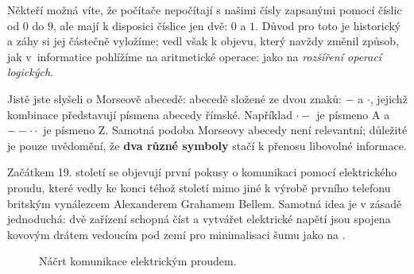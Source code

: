 Někteří možná víte, že počítače nepočítají s našimi  čísly zapsanými
pomocí číslic od $0$ do $9$, ale mají k disposici číslice jen dvě: $0$ a $1$.
Důvod pro toto je historický a záhy si jej částečně vyložíme; vedl však k
objevu, který navždy změnil způsob, jak v~informatice pohlížíme na aritmetické
operace: jako na \emph{rozšíření operací logických}.

Jistě jste slyšeli o Morseově abecedě: abecedě složené ze dvou znaků: $-$ a $
\cdot $, jejichž kombinace představují písmena abecedy římské. Například $ \cdot
-$ je písmeno A a $- - \cdot \cdot$ je písmeno Z. Samotná podoba Morseovy
abecedy není relevantní; důležité je pouze uvědomění, že \textbf{dva různé
symboly} stačí k přenosu libovolné informace.

Začátkem 19. století se objevují první pokusy o komunikaci pomocí elektrického
proudu, které vedly ke konci téhož století mimo jiné k výrobě prvního telefonu
britským vynálezcem Alexanderem Grahamem Bellem. Samotná idea je v zásadě
jednoduchá: dvě zařízení schopná číst a vytvářet elektrické napětí jsou spojena
kovovým drátem vedoucím pod zemí pro minimalisaci šumu jako na
.

\begin{figure}[ht]
  \centering
  \caption{Náčrt komunikace elektrickým proudem.}
  \label{fig:komunikace-proudem}
\end{figure}

